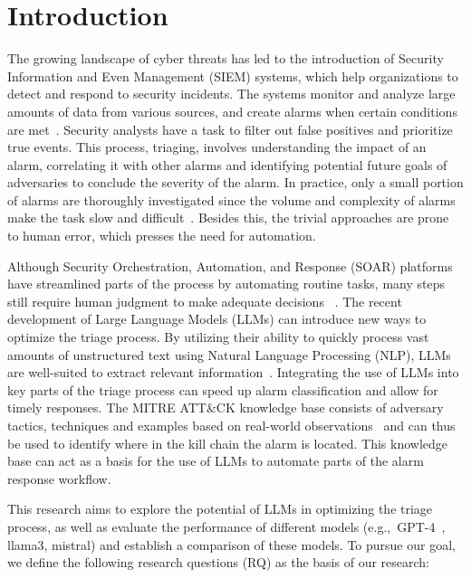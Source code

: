 \section{Introduction}
\label{sec:introduction}

The growing landscape of cyber threats has led to the introduction of Security Information and Even Management (SIEM)
systems, which help organizations to detect and respond to security incidents.
The systems monitor and analyze large amounts of data from various sources, and create alarms when certain conditions
are met\ \citep{ibmsiem}.
Security analysts have a task to filter out false positives and prioritize true events.
This process, triaging, involves understanding the impact of an alarm, correlating it with other alarms and identifying
potential future goals of adversaries to conclude the severity of the alarm.
In practice, only a small portion of alarms are thoroughly investigated since the volume and complexity of alarms make
the task slow and difficult\ \citep{chen2024elevating}.
Besides this, the trivial approaches are prone to human error, which presses the need for automation.

Although Security Orchestration, Automation, and Response (SOAR) platforms have streamlined parts of the process by
automating routine tasks, many steps still require human judgment to make adequate decisions
\ \citep{chuvakin2019triaging}.
The recent development of Large Language Models (LLMs) can introduce new ways to optimize the triage process.
By utilizing their ability to quickly process vast amounts of unstructured text using Natural Language Processing (NLP),
LLMs are well-suited to extract relevant information\ \citep{chaudhary2024ai}.
Integrating the use of LLMs into key parts of the triage process can speed up alarm classification and allow for timely
responses.
The MITRE ATT\&CK knowledge base consists of adversary tactics, techniques and examples based on real-world
observations\ \citep{strom2018mitre} and can thus be used to identify where in the kill chain the alarm is located.
This knowledge base can act as a basis for the use of LLMs to automate parts of the alarm response workflow.

This research aims to explore the potential of LLMs in optimizing the triage process, as well as evaluate the
performance of different models (e.g.,\ GPT-4\ \citep{achiam2023gpt}, llama3, mistral) and establish a comparison of
these models.
To pursue our goal, we define the following research questions (RQ) as the basis of our research:


